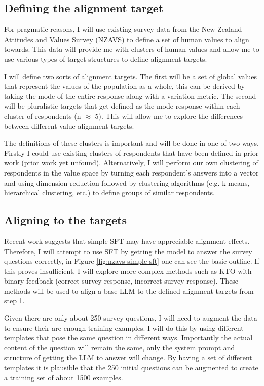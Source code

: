 \subsection{Defining the alignment target}

For pragmatic reasons, I will use existing survey data from the New Zealand Attitudes and Values Survey (NZAVS) \cite{NZAVS2025} to define a set of human values to align towards. This data will provide me with clusters of human values and allow me to use various types of target structures to define alignment targets.

I will define two sorts of alignment targets. The first will be a set of global values that represent the values of the population as a whole, this can be derived by taking the mode of the entire response along with a variation metric. The second will be pluralistic targets that get defined as the mode response within each cluster of respondents (n $\approx$ 5). This will allow me to explore the differences between different value alignment targets.

The definitions of these clusters is important and will be done in one of two ways. Firstly I could use existing clusters of respondents that have been defined in prior work (prior work yet unfound). Alternatively, I will perform our own clustering of respondents in the value space by turning each respondent's answers into a vector and using dimension reduction followed by clustering algorithms (e.g. k-means, hierarchical clustering, etc.) to define groups of similar respondents.

\subsection{Aligning to the targets}

Recent work \cite{nieSurveytoBehaviorDownstreamAlignment2025} suggests that simple SFT may have appreciable alignment effects. Therefore, I will attempt to use SFT by getting the model to answer the survey questions correctly, in Figure \ref{fig:nzavs-simple-sft} one can see the basic outline. If this proves insufficient, I will explore more complex methods such as KTO with binary feedback (correct survey response, incorrect survey response). These methods will be used to align a base LLM to the defined alignment targets from step 1.

Given there are only about 250 survey questions, I will need to augment the data to ensure their are enough training examples. I will do this by using different templates that pose the same question in different ways. Importantly the actual content of the question will remain the same, only the system prompt and structure of getting the LLM to answer will change. By having a set of different templates it is plausible that the 250 initial questions can be augmented to create a training set of about 1500 examples.

